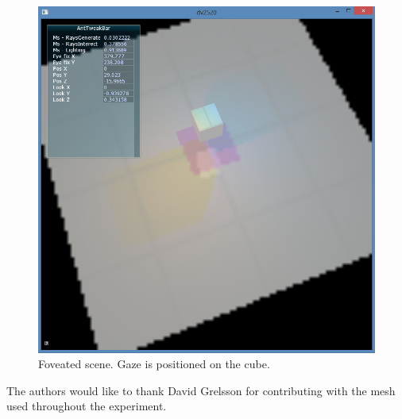 \begin{figure}[h]
  \centering
  \includegraphics[width=0.75\linewidth]{img/fov_rt_et.png}
  \caption{Foveated scene. Gaze is positioned on the cube.}
  \label{fig:fov}
\end{figure}

\noindent
The authors would like to thank David Grelsson for contributing with the mesh used throughout the experiment.
